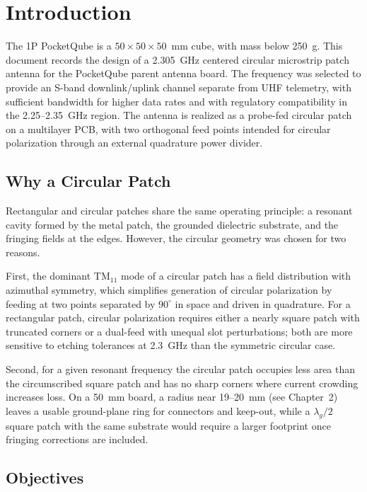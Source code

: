 %
%
%
%

\chapter{Introduction}

The 1P PocketQube is a $50 \times 50 \times 50$~mm cube, with mass below 250~g. This document records the design of a 2.305~GHz centered circular microstrip patch antenna for the PocketQube parent antenna board. The frequency was selected to provide an S-band downlink/uplink channel separate from UHF telemetry, with sufficient bandwidth for higher data rates and with regulatory compatibility in the 2.25--2.35~GHz region. The antenna is realized as a probe-fed circular patch on a multilayer PCB, with two orthogonal feed points intended for circular polarization through an external quadrature power divider.

\section{Why a Circular Patch}

Rectangular and circular patches share the same operating principle: a resonant cavity formed by the metal patch, the grounded dielectric substrate, and the fringing fields at the edges. However, the circular geometry was chosen for two reasons.

First, the dominant $\mathrm{TM}_{11}$ mode of a circular patch has a field distribution with azimuthal symmetry, which simplifies generation of circular polarization by feeding at two points separated by $90^{\circ}$ in space and driven in quadrature. For a rectangular patch, circular polarization requires either a nearly square patch with truncated corners or a dual-feed with unequal slot perturbations; both are more sensitive to etching tolerances at 2.3~GHz than the symmetric circular case.

Second, for a given resonant frequency the circular patch occupies less area than the circumscribed square patch and has no sharp corners where current crowding increases loss. On a 50~mm board, a radius near 19--20~mm (see Chapter~2) leaves a usable ground-plane ring for connectors and keep-out, while a $ \lambda_g/2 $ square patch with the same substrate would require a larger footprint once fringing corrections are included.

\section{Objectives}

